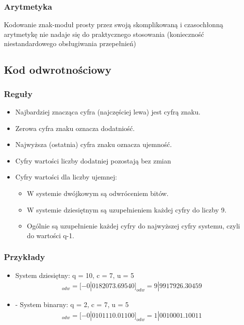 \documentclass[12pt]{article}
\begin{document}
    \subsubsection{Arytmetyka}
    Kodowanie znak-moduł prosty przez swoją skomplikowaną
    i czasochłonną arytmetykę nie nadaje się do praktycznego
    stosowania (konieczność niestandardowego obsługiwania przepełnień)

    \subsection{Kod odwrotnościowy}
    \subsubsection{Reguły}
    \begin{itemize}
        \item Najbardziej znacząca cyfra (najczęściej lewa) jest cyfrą znaku.
        \item Zerowa cyfra znaku oznacza dodatniość.
        \item Najwyższa (ostatnia) cyfra znaku oznacza ujemność.
        \item Cyfry wartości liczby dodatniej pozostają bez zmian
        \item Cyfry wartości dla liczby ujemnej:
        \begin{itemize}
            \item W systemie dwójkowym są odwróceniem bitów.
            \item W systemie dziesiętnym są uzupełnieniem każdej cyfry
            do liczby 9.
            \item Ogólnie są uzupełnienie każdej cyfry do najwyższej cyfry
            systemu, czyli do wartości q-1.
        \end{itemize}
    \end{itemize}

    \subsubsection{Przykłady}
    \begin{itemize}
        \item System dziesiętny:
        q = 10, c = 7, u = 5
        \begin{align*}
        [-182073.6954]
            _{odw} = [-0|0182073.69540]_{odw} = 9|9917926.30459
        \end{align*}

        \item - System binarny:
        q = 2, c = 7, u = 5
        \begin{align*}
        [-101110.011]
            _{odw} = [-0|0101110.01100]_{odw} = 1|0010001.10011
        \end{align*}

    \end{itemize}
\end{document}
